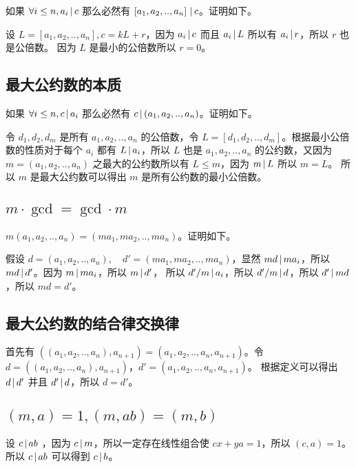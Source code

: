 如果 $\forall i \le n, a_i \,\vert\, c$ 那么必然有 $\left[ a_1, a_2, .., a_n \right]  \,\vert\, c$。证明如下。

设 $L = \left[ a_1, a_2, .., a_n \right], c = kL + r$，因为 $a_i \,\vert\, c$ 而且 $a_i \,\vert\, L$ 所以有 $a_i \,\vert\, r$，所以 $r$ 也是公倍数。
因为 $L$ 是最小的公倍数所以 $ r = 0 $。


\subsection{最大公约数的本质}

如果 $\forall i \le n, c \,\vert\, a_i$ 那么必然有 $ c \,\vert\, (a_1, a_2, .., a_n)$。证明如下。

令 $d_1, d_2, d_m $ 是所有 $a_1, a_2, .., a_n$ 的公倍数，令 $L = \left[ d_1, d_2, .., d_m \right]$。根据最小公倍数的性质对于每个 $a_i$ 都有
$L \,\vert\, a_i $，所以 $L$ 也是 $a_1, a_2, .., a_n$ 的公约数，又因为 $m = (a_1, a_2, .., a_n)$ 之最大的公约数所以有 $L \le m$，因为 $m \,\vert\, L$ 所以  $ m = L$。
所以 $m$ 是最大公约数可以得出 $m$ 是所有公约数的最小公倍数。

\subsection{$m \cdot \gcd = \gcd \cdot m $}

$m(a_1, a_2, .., a_n) = (ma_1, ma_2, .., ma_n)$。证明如下。

假设 $d = (a_1, a_2, .., a_n), \quad d' = (ma_1, ma_2, .., ma_n)$，显然 $md \,\vert\, ma_i$，所以 $md \,\vert\, d'$。因为 $m \,\vert\, ma_i$，所以 $m \,\vert\, d'$，
所以 $d'/m \,\vert\, a_i$，所以  $d'/m \,\vert\, d$，所以 $d' \,\vert\, md$，所以 $md = d'$。

\subsection{最大公约数的结合律交换律}

首先有 $((a_1, a_2, .., a_n), a_{n+1}) =(a_1, a_2, .., a_n, a_{n+1}) $。令 $d = ((a_1, a_2, .., a_n), a_{n+1})$，$d' = (a_1, a_2, .., a_n, a_{n+1})$。
根据定义可以得出 $d \,\vert\, d'$ 并且 $d' \,\vert\, d$，所以 $d = d'$。


\subsection{$(m,a) = 1, (m, ab) = (m,b)$}

设 $c \,\vert\, ab$ ，因为  $c \,\vert\, m$，所以一定存在线性组合使 $cx + ya = 1$，所以  $(c,a) = 1$。所以 $c \,\vert\, ab$ 可以得到 $c \,\vert\, b$。


